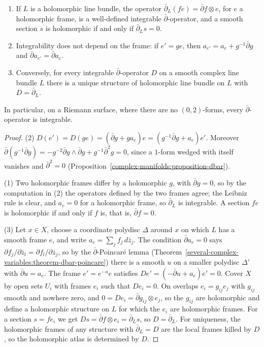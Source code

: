 \begin{proposition}\label{complex-manifolds:proposition-dbar-operator}
\begin{enumerate}
\item If $L$ is a holomorphic line bundle, the operator $\bar\partial_L(fe) = \bar\partial f \otimes e$, for $e$ a holomorphic frame, is a well-defined integrable $\bar\partial$-operator, and a smooth section $s$ is
holomorphic if and only if $\bar\partial_Ls = 0$.
\item Integrability does not depend on the frame: if $e' = ge$, then $a_{e'} = a_e + g^{-1}\bar\partial g$ and $\bar\partial a_{e'} = \bar\partial a_e$.
\item Conversely, for every integrable $\bar\partial$-operator $D$ on a smooth complex line bundle $L$ there is a unique structure of holomorphic line bundle on $L$ with $D = \bar\partial_L$.
\end{enumerate}
In particular, on a Riemann surface, where there are no $(0,2)$-forms, every $\bar\partial$-operator is integrable.
\end{proposition}

\begin{proof}
(2) $D(e') = D(ge) = (\bar\partial g + ga_e)e = (g^{-1}\bar\partial g + a_e)e'$. Moreover $\bar\partial(g^{-1}\bar\partial g) = -g^{-2}\bar\partial g \wedge \bar\partial g + g^{-1}\bar\partial^2g = 0$, since a $1$-form wedged with itself vanishes and $\bar\partial^2 = 0$
(Proposition~\ref{complex-manifolds:proposition-dbar}).

(1) Two holomorphic frames differ by a holomorphic $g$, with $\bar\partial g = 0$, so by the computation in (2) the operators defined by the two frames agree; the Leibniz rule is clear, and $a_e = 0$ for a holomorphic frame, so
$\bar\partial_L$ is integrable. A section $fe$ is holomorphic if and only if $f$ is, that is, $\bar\partial f = 0$.

(3) Let $x \in X$, choose a coordinate polydisc $\Delta$ around $x$ on which $L$ has a smooth frame $e$, and write $a_e = \sum_jf_j\,d\bar z_j$. The condition $\bar\partial a_e = 0$ says
$\partial f_j/\partial\bar z_l = \partial f_l/\partial\bar z_j$, so by the $\bar\partial$-Poincar\'e lemma (Theorem~\ref{several-complex-variables:theorem-dbar-poincare}) there is a smooth $u$ on a smaller polydisc $\Delta'$
with $\bar\partial u = a_e$. The frame $e' = e^{-u}e$ satisfies $De' = (-\bar\partial u + a_e)e' = 0$. Cover $X$ by open sets $U_i$ with frames $e_i$ such that $De_i = 0$. On overlaps $e_i = g_{ij}e_j$ with $g_{ij}$ smooth and
nowhere zero, and $0 = De_i = \bar\partial g_{ij} \otimes e_j$, so the $g_{ij}$ are holomorphic and define a holomorphic structure on $L$ for which the $e_i$ are holomorphic frames. For a section $s = fe_i$ we
get $Ds = \bar\partial f \otimes e_i = \bar\partial_Ls$, so $D = \bar\partial_L$. For uniqueness, the holomorphic frames of any structure with $\bar\partial_L = D$ are the local frames killed by $D$, so the holomorphic
atlas is determined by $D$.
\end{proof}

